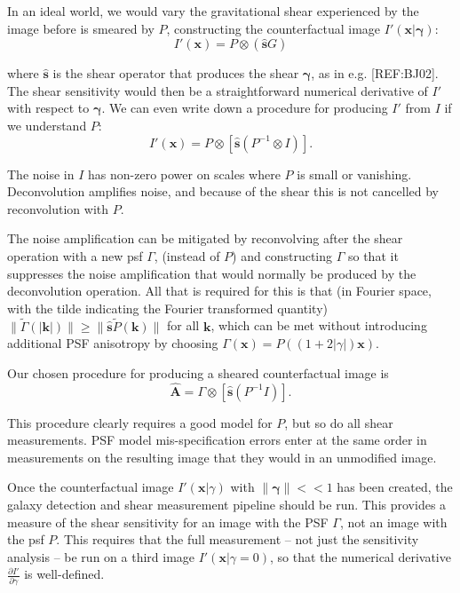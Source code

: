 \documentclass[iop]{emulateapj}
\begin{document}
In an ideal world, we would vary the gravitational shear experienced by the image before is smeared by $P$, constructing the counterfactual image $I'(\mathbf{x}| {\boldsymbol \gamma})$:
\begin{equation}
  I'({\mathbf{x}}) = P \otimes\left( \hat{\mathbf{s}}G\right)
\end{equation}

where $\hat{\mathbf{s}}$ is the shear operator that produces the shear ${\boldsymbol \gamma}$, as in e.g. [REF:BJ02]. The shear sensitivity would then be a straightforward numerical derivative of $I'$ with respect to ${\boldsymbol \gamma}$. We can even write down a procedure for producing $I'$ from $I$ if we understand $P$:
\begin{equation}
  I'({\mathbf{x}}) = P \otimes \left[ \hat{\mathbf{s}}\left( P^{-1} \otimes I \right)\right].
\end{equation}

The noise in $I$ has non-zero power on scales where $P$ is small or vanishing. Deconvolution amplifies noise, and because of the shear this is not cancelled by reconvolution with $P$. 

The noise amplification can be mitigated by reconvolving after the shear operation with a new psf $\Gamma$, (instead of $P$) and constructing $\Gamma$ so that it suppresses the noise amplification that would normally be produced by the deconvolution operation. All that is required for this is that (in Fourier space, with the tilde indicating the Fourier transformed quantity) $\|\tilde{\Gamma}(\mathbf{|k|}) \| \geq \|\hat{\mathbf{s}} \tilde{P}(\mathbf{k})\|$ for all $\mathbf{k}$, which can be met without introducing additional PSF anisotropy by choosing $\Gamma(\mathbf{x}) = P\left((1+2|\gamma|)\mathbf{x}\right)$.

Our chosen procedure for producing a sheared counterfactual image is
\begin{equation}
\hat{\mathbf{A}}  = \Gamma \otimes \left[ \hat{\mathbf{s}} \left(P^{-1} I \right)\right].
\end{equation}

This procedure clearly requires a good model for $P$, but so do all shear measurements. PSF model mis-specification errors enter at the same order in measurements on the resulting image that they would in an unmodified image.

Once the counterfactual image $I'(\mathbf{x}|\gamma)$ with $\|{\boldsymbol \gamma}\| << 1$ has been created, the galaxy detection and  shear measurement pipeline should be run. This provides a measure of the shear sensitivity for an image with the PSF $\Gamma$, not an image with the psf $P$. This requires that the full measurement -- not just the sensitivity analysis -- be run on a third image $I'(\mathbf{x}|\gamma=0)$, so that the numerical derivative $\frac{\partial I'}{\partial \gamma}$ is well-defined. 
\end{document}
